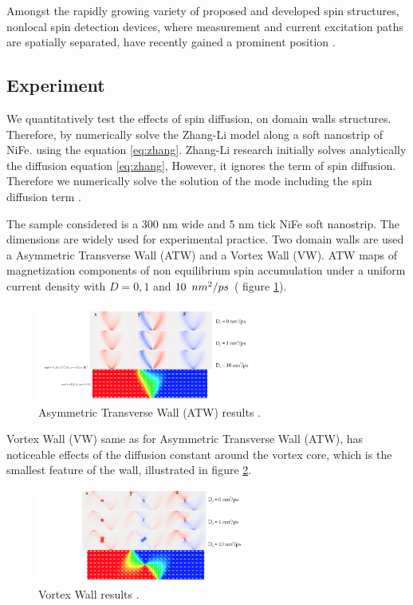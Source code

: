 Amongst the rapidly growing variety of proposed and developed spin structures, nonlocal spin detection devices, where measurement and current excitation paths are spatially separated, have recently gained a prominent position \cite{spinz}.

\subsection{Experiment}

We quantitatively test the effects of spin diffusion, on domain walls structures. Therefore, by numerically solve the Zhang-Li model along a soft nanostrip of NiFe. using the equation \ref{eq:zhang}. Zhang-Li research initially solves analytically the diffusion equation \ref{eq:zhang}, However, it ignores the term of spin diffusion. Therefore we numerically solve the solution of the mode including the spin diffusion term \cite{zhang}.

The sample considered is a 300 nm wide and 5 nm tick NiFe soft nanostrip. The dimensions are widely used for experimental practice. Two domain walls are used a Asymmetric Transverse Wall (ATW) and a Vortex Wall (VW). ATW maps of magnetization components of non equilibrium spin accumulation under a uniform current density with $D = 0, 1$ and $10 \enskip nm^2 / ps$ ( figure \ref{fig:atw}).

\begin{figure}[htbp]
	\centering
		\includegraphics[width=0.64\textwidth]{Figures/ATW.png}
		\smallskip
	\caption[Asymmetric Transverse Wall results]{Asymmetric Transverse Wall (ATW) results \cite{claudio}.}
	\label{fig:atw}
\end{figure}

Vortex Wall (VW) same as for Asymmetric Transverse Wall (ATW), has noticeable effects of the diffusion constant around the vortex core, which is the smallest feature of the wall, illustrated in figure \ref{fig:vw}.

\begin{figure}[htbp]
	\centering
		\includegraphics[width=0.64\textwidth]{Figures/VW.png}
		\smallskip
	\caption[Vortex Wall results]{Vortex Wall results \cite{claudio}. }
	\label{fig:vw}
\end{figure}

